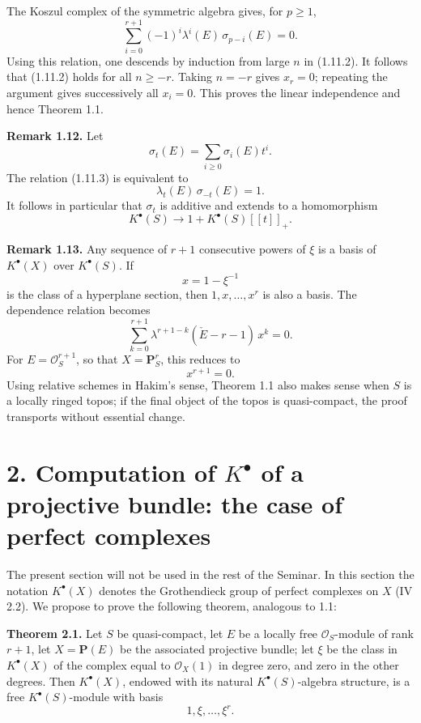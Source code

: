 The Koszul complex of the symmetric algebra gives, for \(p\geq 1\),
\begin{equation}\tag{1.11.3}
  \sum_{i=0}^{r+1}(-1)^i\lambda^i(E)\,\sigma_{p-i}(E)=0 .
\end{equation}
Using this relation, one descends by induction from large \(n\) in (1.11.2). It follows that (1.11.2) holds for all \(n\geq -r\). Taking \(n=-r\) gives \(x_r=0\); repeating the argument gives successively all \(x_i=0\). This proves the linear independence and hence Theorem 1.1.

\textbf{Remark 1.12.} Let
\[
  \sigma_t(E)=\sum_{i\geq 0}\sigma_i(E)t^i .
\]
The relation (1.11.3) is equivalent to
\[
  \lambda_t(E)\,\sigma_{-t}(E)=1.
\]
It follows in particular that \(\sigma_t\) is additive and extends to a homomorphism
\[
  K^\bullet(S)\longrightarrow 1+K^\bullet(S)[[t]]_+ .
\]

\textbf{Remark 1.13.} Any sequence of \(r+1\) consecutive powers of \(\xi\) is a basis of \(K^\bullet(X)\) over \(K^\bullet(S)\). If
\[
  x=1-\xi^{-1}
\]
is the class of a hyperplane section, then \(1,x,\ldots,x^r\) is also a basis. The dependence relation becomes
\begin{equation}\tag{1.13.1}
  \sum_{k=0}^{r+1}\lambda^{r+1-k}(\check E-r-1)\,x^k=0.
\end{equation}
For \(E=\mathcal O_S^{r+1}\), so that \(X=\mathbf P^r_S\), this reduces to
\[
  x^{r+1}=0.
\]
Using relative schemes in Hakim's sense, Theorem 1.1 also makes sense when \(S\) is a locally ringed topos; if the final object of the topos is quasi-compact, the proof transports without essential change.

\section*{2. Computation of \(K^\bullet\) of a projective bundle: the case of perfect complexes}

The present section will not be used in the rest of the Seminar. In this section the notation \(K^\bullet(X)\) denotes the Grothendieck group of perfect complexes on \(X\) (IV 2.2). We propose to prove the following theorem, analogous to 1.1:

\textbf{Theorem 2.1.} Let \(S\) be quasi-compact, let \(E\) be a locally free \(\mathcal O_S\)-module of rank \(r+1\), let \(X=\mathbf P(E)\) be the associated projective bundle; let \(\xi\) be the class in \(K^\bullet(X)\) of the complex equal to \(\mathcal O_X(1)\) in degree zero, and zero in the other degrees. Then \(K^\bullet(X)\), endowed with its natural \(K^\bullet(S)\)-algebra structure, is a free \(K^\bullet(S)\)-module with basis
\[
  1,\xi,\ldots,\xi^r .
\]

